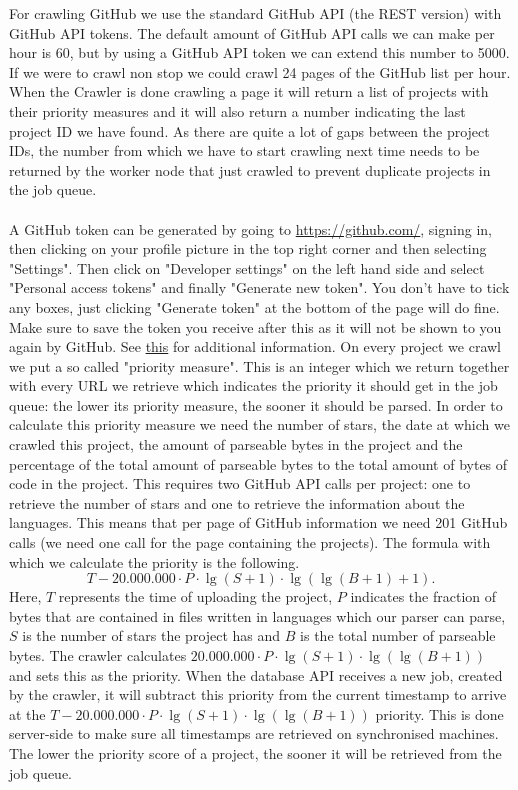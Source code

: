 \documentclass[../Main.tex]{subfiles}
\begin{document}
For crawling GitHub we use the standard GitHub API (the REST version) with GitHub API tokens. The default amount of GitHub API calls we can make per hour is 60, but by using a GitHub API token we can extend this number to 5000. If we were to crawl non stop we could crawl 24 pages of the GitHub list per hour. \\
When the Crawler is done crawling a page it will return a list of projects with their priority measures and it will also return a number indicating the last project ID we have found. As there are quite a lot of gaps between the project IDs, 
the number from which we have to start crawling next time needs to be returned by the worker node that just crawled to prevent duplicate projects in the job queue. 
~\\
~\\
A GitHub token can be generated by going to \url{https://github.com/}, signing in, then clicking on your profile picture in the top right corner and then selecting "Settings". Then click on "Developer settings" on the left hand side and select "Personal access tokens" and finally "Generate new token". You don't have to tick any boxes, just clicking "Generate token" at the bottom of the page will do fine. Make sure to save the token you receive after this as it will not be shown to you again by GitHub. See \href{https://docs.github.com/en/github/authenticating-to-github/keeping-your-account-and-data-secure/creating-a-personal-access-token}{this} for additional information.
\newpage
{}
On every project we crawl we put a so called "priority measure". This is an integer which we return together with every URL we retrieve which indicates the priority it should get in the job queue: the lower its priority measure, the sooner it should be parsed. In order to calculate this priority measure we need the number of stars, the date at which we crawled this project, the amount of parseable bytes in the project and the percentage of the total amount of parseable bytes to the total amount of bytes of code in the project. This requires two GitHub API calls per project: one to retrieve the number of stars and one to retrieve the information about the languages. This means that per page of GitHub information we need 201 GitHub calls (we need one call for the page containing the projects). The formula with which we calculate the priority is the following.
\[
T - 20.000.000 \cdot P \cdot \lg(S+1) \cdot \lg(\lg(B+1)+1).
\]
Here, $T$ represents the time of uploading the project, $P$ indicates the fraction of bytes that are contained in files written in languages which our parser can parse, $S$ is the number of stars the project has and $B$ is the total number of parseable bytes. The crawler calculates $20.000.000 \cdot P \cdot \lg(S+1) \cdot \lg(\lg(B+1))$ and sets this as the priority. When the database API receives a new job, created by the crawler, it will subtract this priority from the current timestamp to arrive at the $T - 20.000.000 \cdot P \cdot \lg(S+1) \cdot \lg(\lg(B+1))$ priority. This is done server-side to make sure all timestamps are retrieved on synchronised machines. The lower the priority score of a project, the sooner it will be retrieved from the job queue.\\
\end{document}
